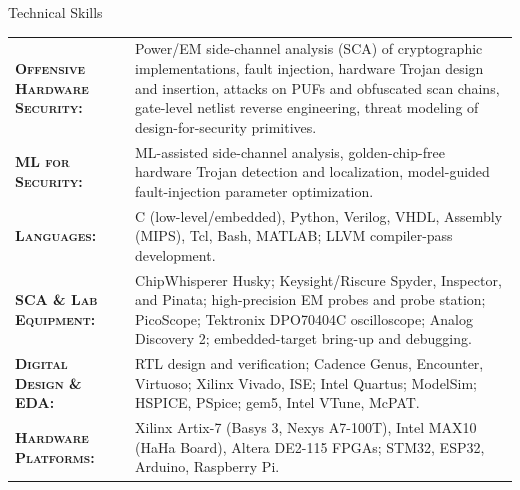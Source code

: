 \begin{rSection}{Technical Skills}

\begin{tabularx}{\textwidth}{@{}p{5.4cm} X@{}}
    \textsc{\textbf{Offensive Hardware Security:}} & Power/EM side-channel analysis (SCA) of cryptographic implementations, fault injection, hardware Trojan design and insertion, attacks on PUFs and obfuscated scan chains, gate-level netlist reverse engineering, threat modeling of design-for-security primitives.\\
    \textsc{\textbf{ML for Security:}} & ML-assisted side-channel analysis, golden-chip-free hardware Trojan detection and localization, model-guided fault-injection parameter optimization.\\
    \textsc{\textbf{Languages:}} & C (low-level/embedded), Python, Verilog, VHDL, Assembly (MIPS), Tcl, Bash, MATLAB; LLVM compiler-pass development.\\
    \textsc{\textbf{SCA \& Lab Equipment:}} & ChipWhisperer Husky; Keysight/Riscure Spyder, Inspector, and Pinata; high-precision EM probes and probe station; PicoScope; Tektronix DPO70404C oscilloscope; Analog Discovery 2; embedded-target bring-up and debugging.\\
    \textsc{\textbf{Digital Design \& EDA:}} & RTL design and verification; Cadence Genus, Encounter, Virtuoso; Xilinx Vivado, ISE; Intel Quartus; ModelSim; HSPICE, PSpice; gem5, Intel VTune, McPAT.\\
    \textsc{\textbf{Hardware Platforms:}} & Xilinx Artix-7 (Basys 3, Nexys A7-100T), Intel MAX10 (HaHa Board), Altera DE2-115 FPGAs; STM32, ESP32, Arduino, Raspberry Pi.\\
\end{tabularx}

\end{rSection}
